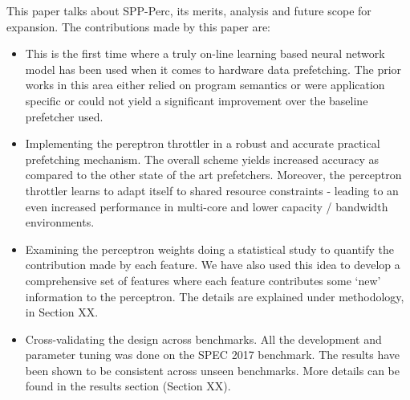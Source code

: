 \vspace{1ex}This paper talks about SPP-Perc, its merits, analysis and
future scope for expansion.  The contributions made by this paper are:

\begin{itemize}
\item This is the first time where a truly on-line learning based
  neural network model has been used when it comes to hardware data
  prefetching.  The prior works in this area either relied on program
  semantics\cite{Semantics} or were application
  specific\cite{Datacenter} or could not yield a significant
  improvement over the baseline prefetcher used\cite{BadPerc}.

\item Implementing the pereptron throttler in a robust and accurate
  practical prefetching mechanism.  The overall scheme yields
  increased accuracy as compared to the other state of the art
  prefetchers.  Moreover, the perceptron throttler learns to adapt
  itself to shared resource constraints - leading to an even increased
  performance in multi-core and lower capacity / bandwidth
  environments.

\item Examining the perceptron weights doing a statistical study to
  quantify the contribution made by each feature.  We have also used
  this idea to develop a comprehensive set of features where each
  feature contributes some `new' information to the perceptron.  The
  details are explained under methodology, in Section XX.

\item Cross-validating the design across benchmarks.  All the
  development and parameter tuning was done on the SPEC 2017
  benchmark.  The results have been shown to be consistent across
  unseen benchmarks.  More details can be found in the results section
  (Section XX).



\end{itemize}

